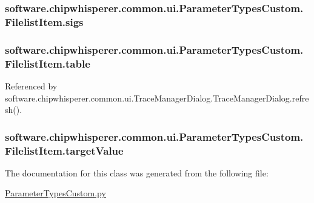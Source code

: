 \subsubsection[{sigs}]{\setlength{\rightskip}{0pt plus 5cm}software.\+chipwhisperer.\+common.\+ui.\+Parameter\+Types\+Custom.\+Filelist\+Item.\+sigs}\label{classsoftware_1_1chipwhisperer_1_1common_1_1ui_1_1ParameterTypesCustom_1_1FilelistItem_ab079e63094f9ed2051d1b92145c11827}
\hypertarget{classsoftware_1_1chipwhisperer_1_1common_1_1ui_1_1ParameterTypesCustom_1_1FilelistItem_ab7a5ad52b06b011e6439238300ef1742}{}
\subsubsection[{table}]{\setlength{\rightskip}{0pt plus 5cm}software.\+chipwhisperer.\+common.\+ui.\+Parameter\+Types\+Custom.\+Filelist\+Item.\+table}\label{classsoftware_1_1chipwhisperer_1_1common_1_1ui_1_1ParameterTypesCustom_1_1FilelistItem_ab7a5ad52b06b011e6439238300ef1742}


Referenced by software.\+chipwhisperer.\+common.\+ui.\+Trace\+Manager\+Dialog.\+Trace\+Manager\+Dialog.\+refresh().

\hypertarget{classsoftware_1_1chipwhisperer_1_1common_1_1ui_1_1ParameterTypesCustom_1_1FilelistItem_aec76d239796dacf3642c3377caafa6f1}{}
\subsubsection[{target\+Value}]{\setlength{\rightskip}{0pt plus 5cm}software.\+chipwhisperer.\+common.\+ui.\+Parameter\+Types\+Custom.\+Filelist\+Item.\+target\+Value}\label{classsoftware_1_1chipwhisperer_1_1common_1_1ui_1_1ParameterTypesCustom_1_1FilelistItem_aec76d239796dacf3642c3377caafa6f1}


The documentation for this class was generated from the following file\+:\begin{DoxyCompactItemize}
\item 
\hyperlink{ParameterTypesCustom_8py}{Parameter\+Types\+Custom.\+py}\end{DoxyCompactItemize}
